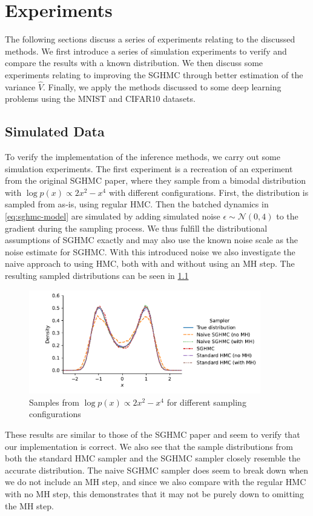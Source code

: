 \chapter{Experiments}

The following sections discuss a series of experiments relating to the discussed methods. 
We first introduce a series of simulation experiments to verify and compare the results with a known distribution.
We then discuss some experiments relating to improving the SGHMC through better estimation of the variance $\hat{V}$.
Finally, we apply the methods discussed to some deep learning problems using the MNIST and CIFAR10 datasets.

\section{Simulated Data}

To verify the implementation of the inference methods, we carry out some simulation experiments.
The first experiment is a recreation of an experiment from the original SGHMC paper, where they sample from a bimodal distribution with $\log p(x) \propto 2 x^2 - x^ 4$ with different configurations. 
First, the distribution is sampled from as-is, using regular HMC.
Then the batched dynamics in \cref{eq:sghmc-model} are simulated by adding simulated noise $\epsilon \sim \mathcal{N}(0, 4)$ to the gradient during the sampling process. 
We thus fulfill the distributional assumptions of SGHMC exactly and may also use the known noise scale as the noise estimate for SGHMC. 
With this introduced noise we also investigate the naive approach to using HMC, both with and without using an MH step. 
The resulting sampled distributions can be seen in \cref{fig:synthetic}
\begin{figure}[htb]
    \centering
    \includegraphics[width=0.9\textwidth]{Figures/synthetic.pdf}
    \caption{Samples from $\log p(x) \propto 2 x^2 - x^ 4$ for different sampling configurations}
    \label{fig:synthetic}
\end{figure}
These results are similar to those of the SGHMC paper and seem to verify that our implementation is correct.
We also see that the sample distributions from both the standard HMC sampler and the SGHMC sampler closely resemble the accurate distribution. 
The naive SGHMC sampler does seem to break down when we do not include an  MH step, and since we also compare with the regular HMC with no MH step, this demonstrates that it may not be purely down to omitting the MH step. 

